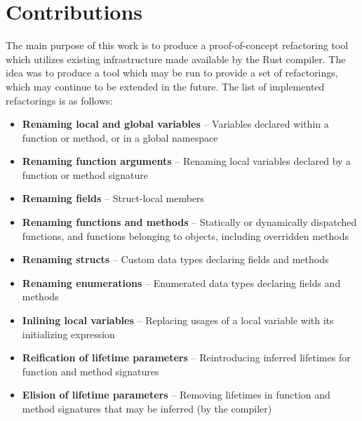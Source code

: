 
\section{Contributions}\label{S:implemented}
The main purpose of this work is to produce a proof-of-concept refactoring tool which utilizes existing infrastructure made available by the Rust compiler. The idea was to produce a tool which may be run to provide a set of refactorings, which may continue to be extended in the future. The list of implemented refactorings is as follows:


\begin{itemize}
\item {\bfseries Renaming local and global variables} -- Variables declared within a function or method, or in a global namespace
\item {\bfseries Renaming function arguments} -- Renaming local variables declared by a function or method signature
\item {\bfseries Renaming fields} -- Struct-local members
\item {\bfseries Renaming functions and methods} -- Statically or dynamically dispatched functions, and functions belonging to objects, including overridden methods
\item {\bfseries Renaming structs} -- Custom data types declaring fields and methods
\item {\bfseries Renaming enumerations} -- Enumerated data types declaring fields and methods
\item {\bfseries Inlining local variables} -- Replacing usages of a local variable with its initializing expression
\item {\bfseries Reification of lifetime parameters} -- Reintroducing inferred lifetimes for function and method signatures
\item {\bfseries Elision of lifetime parameters} -- Removing lifetimes in function and method signatures that may be inferred (by the compiler)
\end{itemize}


